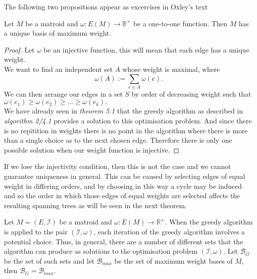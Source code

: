 \documentclass[../main.tex]{subfiles}
\begin{document}
The following two propositions appear as excercises in Oxley's text\cite{ox_book}
\begin{prop}
Let $M$ be a matroid and $\omega: E(M) \longrightarrow \mathbb{R^+}$ be a one-to-one function. Then $M$ has a unique basis of maximum weight.
\end{prop}
\begin{proof}
Let $\omega$ be an injective function, this will mean that each edge has a unique weight. \\
We want to find an independent set $A$ whose weight is maximal, where
\begin{equation}
\omega(A) := \sum_{e \in A} \omega (e).
\end{equation}
We can then arrange our edges in a set $S$ by order of decreasing weight such that $\omega(e_1) \geq \omega(e_2) \geq ... \geq \omega(e_k).$\\
We have already seen in \textit{theorem 5.1} that the greedy algorithm as described in \textit{algorithm 2/4.1} provides a solution to this optimisation problem. And since there is no repitition in weights there is no point in the algorithm where there is more than a single choice as to the next chosen edge. Therefore there is only one possible solution when our weight function is injective.
\end{proof}
\begin{rem}
If we lose the injectivity condition, then this is not the case and we cannot guarantee uniqueness in general. This can be caused by selecting edges of equal weight in differing orders, and by choosing in this way a cycle may be induced and so the order in which those edges of equal weights are selected affects the resulting spanning trees as will be seen in the next theorem.
\end{rem}
\begin{prop}
Let $M=(E,\mathcal{I})$ be a matroid and $\omega: E(M) \longrightarrow \mathbb{R^+}.$ When the greedy algorithm is applied to the pair $(\mathcal{I},\omega)$, each iteration of the greedy algorithm involves a potential choice. Thus, in general, there are a number of different sets that the algorithm can produce as solutions to the optimisation problem $(\mathcal{I}, \omega).$ Let $\mathcal{B}_G$ be the set of such sets and let $\mathcal{B}_{max}$ be the set of maximum weight bases of $M,$ then $\mathcal{B}_G = \mathcal{B}_{max}.$
\end{prop}
\end{document}
